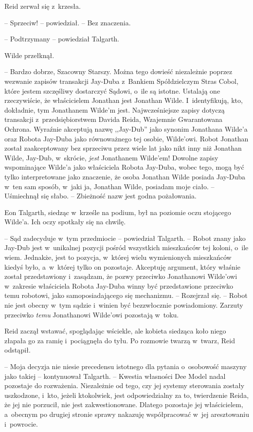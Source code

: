 \documentclass[oneside,polish,11pt,sfheadings]{mwbk}
\begin{document}
Reid zerwał się z~krzesła.

-- Sprzeciw! -- powiedział. -- Bez znaczenia.

-- Podtrzymany -- powiedział Talgarth.

Wilde przełknął. 

-- Bardzo dobrze, Szacowny Starszy. Można tego dowieść
niezależnie poprzez wezwanie zapisów transakcji Jay-Duba z~Bankiem
Spółdzielczym Stras Cobol, które jestem szczęśliwy dostarczyć Sądowi, o~ile są istotne. Ustalają one rzeczywiście, że właścicielem Jonathan jest
Jonathan Wilde. I~identyfikują, kto, dokładnie, tym Jonathanem Wilde'm
jest. Najwcześniejsze zapisy dotyczą transakcji z~przedsiębiorstwem
Davida Reida, Wzajemnie Gwarantowana Ochrona. Wyraźnie akceptują nazwę
,,Jay-Dub'' jako synonim Jonathana Wilde'a oraz Robota Jay-Duba jako
równoważnego tej osobie, Wilde'owi. Robot Jonathan został zaakceptowany
bez sprzeciwu przez wiele lat jako nikt inny niż Jonathan Wilde,
Jay-Dub, w~skrócie, \emph{jest} Jonathanem Wilde'em! Dowolne zapisy
wspominające Wilde'a jako właściciela Robota Jay-Duba, wobec tego, mogą
być tylko interpretowane jako znaczenie, że osoba Jonathan Wilde posiada
Jay-Duba w~ten sam sposób, w~jaki ja, Jonathan Wilde, posiadam moje
ciało. -- Uśmiechnął się słabo. -- Zbieżność nazw jest godna pożałowania.

Eon Talgarth, siedząc w~krześle na podium, był na poziomie oczu
stojącego Wilde'a. Ich oczy spotkały się na chwilę.

-- Sąd zadecyduje w~tym przedmiocie -- powiedział Talgarth. -- Robot znany
jako Jay-Dub jest w~unikalnej pozycji pośród wszystkich mieszkańców tej
koloni, o~ile wiem. Jednakże, jest to pozycja, w~której wielu
wymienionych mieszkańców kiedyś było, a~w~której tylko on pozostaje.
Akceptuję argument, który właśnie został przedstawiony i~zasądzam, że
pozwy przeciwko Jonathanowi Wilde'owi w~zakresie właściciela Robota
Jay-Duba winny być przedstawione przeciwko temu robotowi, jako
samoposiadającego się mechanizmu. -- Rozejrzał się. -- Robot nie jest
obecny w~tym sądzie i~winien być bezzwłocznie powiadomiony. Zarzuty
przeciwko \emph{temu} Jonathanowi Wilde'owi pozostają w~toku.

Reid zaczął wstawać, spoglądając wściekle, ale kobieta siedząca koło
niego złapała go za ramię i~pociągnęła do tyłu. Po rozmowie twarzą w~twarz, Reid odstąpił.

-- Moja decyzja nie niesie precedensu istotnego dla pytania o~osobowość
maszyny jako takiej -- kontynuował Talgarth. -- Kwestia własności Dee
Model nadal pozostaje do rozważenia. Niezależnie od tego, czy jej
systemy sterowania zostały uszkodzone, i~kto, jeżeli ktokolwiek, jest
odpowiedzialny za to, twierdzenie Reida, że jej nie porzucił, nie jest
zakwestionowane. Dlatego pozostaje jej właścicielem, a~obecnym po
drugiej stronie sprawy nakazuję współpracować w~jej aresztowaniu i~powrocie.
\end{document}
